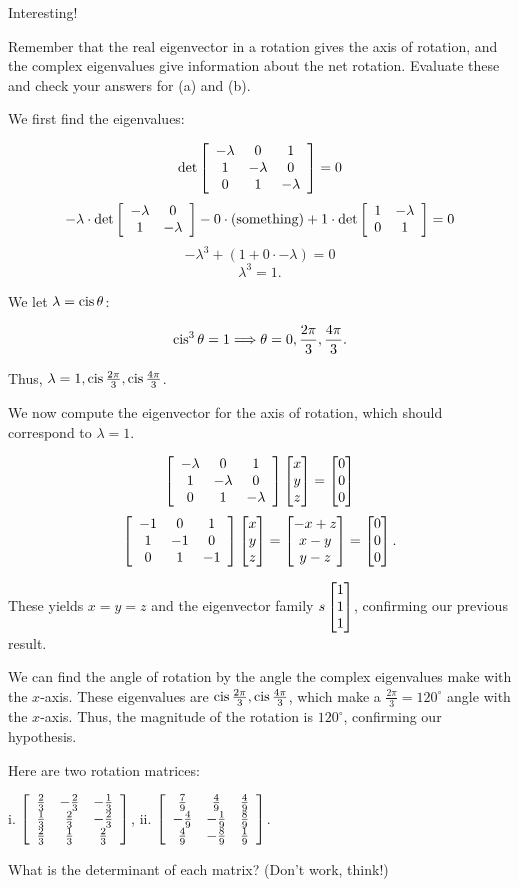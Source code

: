 \documentclass[../key.tex]{subfiles}
\begin{document}
{{Interesting!

\begin{inner_problem}
\item Remember that the real eigenvector in a rotation gives the axis of rotation, and the complex eigenvalues give information about the net rotation. Evaluate these and check your answers for (a) and (b).
\end{inner_problem}

We first find the eigenvalues:

$$\det \left[\begin{array}{ccc} -\lambda & 0 & 1 \\ 1 & -\lambda & 0 \\ 0 & 1 & -\lambda \end{array}\right]=0$$
$$-\lambda\cdot \det\left[\begin{array}{cc} -\lambda & 0 \\ 1 & -\lambda \end{array}\right] - 0\cdot(\text{something}) + 1\cdot \det\left[\begin{array}{cc} 1 & -\lambda \\ 0 & 1 \end{array}\right]=0$$
$$-\lambda^3 + (1 + 0\cdot -\lambda)=0$$
$$\lambda^3 = 1.$$

We let $\lambda = \operatorname{cis}\theta$:

$$\operatorname{cis}^3\theta=1 \Longrightarrow \theta = 0,\frac{2\pi}{3},\frac{4\pi}{3}.$$

Thus, $\lambda = 1, \operatorname{cis} \frac{2\pi}{3}, \operatorname{cis} \frac{4\pi}{3}$.

We now compute the eigenvector for the axis of rotation, which should correspond to $\lambda = 1$.

$$\left[\begin{array}{ccc} -\lambda & 0 & 1 \\ 1 & -\lambda & 0 \\ 0 & 1 & -\lambda \end{array}\right]\begin{bmatrix} x \\ y \\ z \end{bmatrix} = \begin{bmatrix} 0 \\ 0 \\ 0 \end{bmatrix}$$
$$\left[\begin{array}{ccc} -1 & 0 & 1 \\ 1 & -1 & 0 \\ 0 & 1 & -1 \end{array}\right]\begin{bmatrix} x \\ y \\ z \end{bmatrix} = \begin{bmatrix} -x+z \\ x-y \\ y-z \end{bmatrix} = \begin{bmatrix} 0 \\ 0 \\ 0 \end{bmatrix}.$$

These yields $x=y=z$ and the eigenvector family $s\begin{bmatrix} 1 \\ 1 \\ 1 \end{bmatrix}$, confirming our previous result.

We can find the angle of rotation by the angle the complex eigenvalues make with the $x$-axis. These eigenvalues are $\operatorname{cis} \frac{2\pi}{3}, \operatorname{cis} \frac{4\pi}{3}$, which make a $\frac{2\pi}{3} = 120^\circ$ angle with the $x$-axis. Thus, the magnitude of the rotation is $120^\circ$, confirming our hypothesis.

\begin{outer_problem}
\item Here are two rotation matrices:

i. $\left[\begin{array}{ccc} \frac{2}{3} & -\frac{2}{3} & -\frac{1}{3} \\ \frac{1}{3} & \frac{2}{3} & -\frac{2}{3} \\ \frac{2}{3} & \frac{1}{3} & \frac{2}{3} \end{array}\right]$, ii. $\left[\begin{array}{ccc} \frac{7}{9} & \frac{4}{9} & \frac{4}{9} \\ -\frac{4}{9} & -\frac{1}{9} & \frac{8}{9} \\ \frac{4}{9} & -\frac{8}{9} & \frac{1}{9} \end{array}\right]$.
\end{outer_problem}

\begin{inner_problem}[start=1]
\item What is the determinant of each matrix? (Don't work, think!)
\end{inner_problem}

}}
\end{document}
